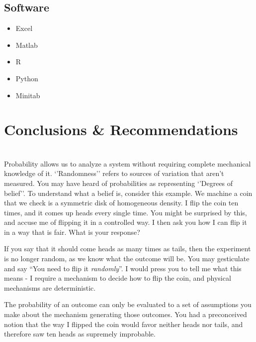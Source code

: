 \documentclass[11pt,a4paper,article]{memoir} %
\begin{document}
\section{Software}
\begin{itemize}
\item Excel
\item Matlab
\item R
\item Python
\item Minitab
\end{itemize}

\newpage


\chapter{Conclusions \& Recommendations}

\newpage
\appendix
\chapter{}
Probability allows us to analyze a system without requiring complete mechanical knowledge of it. `'Randomness'' refers to sources of variation that aren't measured. You may have heard of probabilities as representing `'Degrees of belief''. To understand what a belief is, consider this example. We machine a coin that we check is a symmetric disk of homogeneous density. I flip the coin ten times, and it comes up heads every single time. You might be surprised by this, and accuse me of flipping it in a controlled way. I then ask you how I can flip it in a way that is fair. What is your response?
\par
If you say that it should come heads as many times as tails, then the experiment is no longer random, as we know what the outcome will be. You may gesticulate and say ``You need to flip it \emph{randomly}''. I would press you to tell me what this means - I require a mechanism to decide how to flip the coin, and physical mechanisms are deterministic.
\par
The probability of an outcome can only be evaluated to a set of assumptions you make about the mechanism generating those outcomes. You had a preconceived notion that the way I flipped the coin would favor neither heads nor tails, and therefore saw ten heads as supremely improbable.

\end{document}
